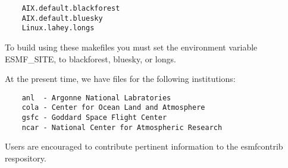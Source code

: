 \begin{verbatim}
	AIX.default.blackforest
	AIX.default.bluesky
	Linux.lahey.longs
\end{verbatim}

To build using these makefiles you must set the environment variable ESMF\_SITE, to blackforest, bluesky, or longs.

At the present time, we have files for the following institutions:

\begin{verbatim}
	anl  - Argonne National Labratories
	cola - Center for Ocean Land and Atmosphere
	gsfc - Goddard Space Flight Center
	ncar - National Center for Atmospheric Research
\end{verbatim}


Users are encouraged to contribute pertinent information to the esmfcontrib respository.




